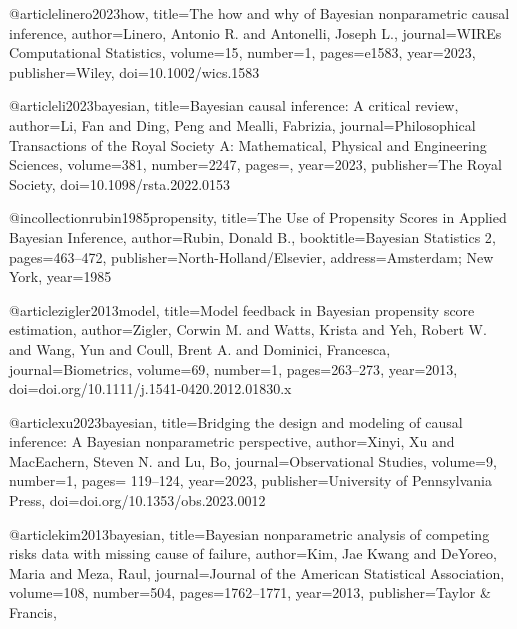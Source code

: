 @article{linero2023how,
  title={The how and why of Bayesian nonparametric causal inference},
  author={Linero, Antonio R. and Antonelli, Joseph L.},
  journal={WIREs Computational Statistics},
  volume={15},
  number={1},
  pages={e1583},
  year={2023},
  publisher={Wiley},
  doi={10.1002/wics.1583}
}






@article{li2023bayesian,
  title={Bayesian causal inference: A critical review},
  author={Li, Fan and Ding, Peng and Mealli, Fabrizia},
  journal={Philosophical Transactions of the Royal Society A: Mathematical, Physical and Engineering Sciences},
  volume={381},
  number={2247},
  pages={},
  year={2023},
  publisher={The Royal Society},
  doi={10.1098/rsta.2022.0153}
}





@incollection{rubin1985propensity,
  title={The Use of Propensity Scores in Applied Bayesian Inference},
  author={Rubin, Donald B.},
  booktitle={Bayesian Statistics 2},
  pages={463--472},
  publisher={North-Holland/Elsevier},
  address={Amsterdam; New York},
  year={1985}
}





@article{zigler2013model,
  title={Model feedback in Bayesian propensity score estimation},
  author={Zigler, Corwin M. and Watts, Krista and Yeh, Robert W. and Wang, Yun and Coull, Brent A. and Dominici, Francesca},
  journal={Biometrics},
  volume={69},
  number={1},
  pages={263--273},
  year={2013},
  doi={doi.org/10.1111/j.1541-0420.2012.01830.x}
}





@article{xu2023bayesian,
  title={Bridging the design and modeling of causal inference: A
Bayesian nonparametric perspective},
  author={Xinyi, Xu and MacEachern, Steven N. and Lu, Bo},
  journal={Observational Studies},
  volume={9},
  number={1},
  pages={ 119--124},
  year={2023},
  publisher={University of Pennsylvania Press},
  doi={doi.org/10.1353/obs.2023.0012}
}





@article{kim2013bayesian,
  title={Bayesian nonparametric analysis of competing risks data with missing cause of failure},
  author={Kim, Jae Kwang and DeYoreo, Maria and Meza, Raul},
  journal={Journal of the American Statistical Association},
  volume={108},
  number={504},
  pages={1762--1771},
  year={2013},
  publisher={Taylor \& Francis},
  }





